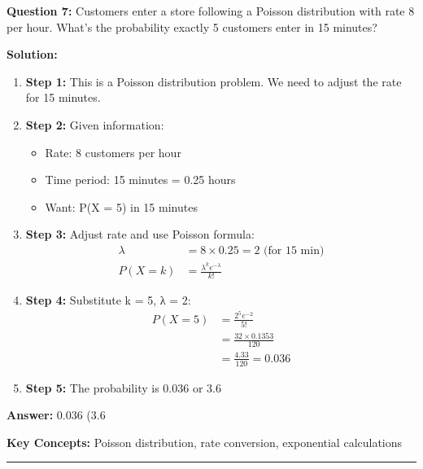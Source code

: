 \textbf{Question 7:} Customers enter a store following a Poisson distribution with rate 8 per hour. What's the probability exactly 5 customers enter in 15 minutes?

\textbf{Solution:}
\begin{enumerate}
\item \textbf{Step 1:} This is a Poisson distribution problem. We need to adjust the rate for 15 minutes.

\item \textbf{Step 2:} Given information:
\begin{itemize}
\item Rate: 8 customers per hour
\item Time period: 15 minutes = 0.25 hours  
\item Want: P(X = 5) in 15 minutes
\end{itemize}

\item \textbf{Step 3:} Adjust rate and use Poisson formula:
\begin{align}
\lambda &= 8 \times 0.25 = 2 \text{ (for 15 min)} \\
P(X = k) &= \frac{\lambda^k e^{-\lambda}}{k!}
\end{align}

\item \textbf{Step 4:} Substitute k = 5, λ = 2:
\begin{align}
P(X = 5) &= \frac{2^5 e^{-2}}{5!} \\
&= \frac{32 \times 0.1353}{120} \\
&= \frac{4.33}{120} = 0.036
\end{align}

\item \textbf{Step 5:} The probability is 0.036 or 3.6%
\end{enumerate}

\textbf{Answer:} 0.036 (3.6%

\textbf{Key Concepts:} Poisson distribution, rate conversion, exponential calculations

\hrule
\vspace{1em}
